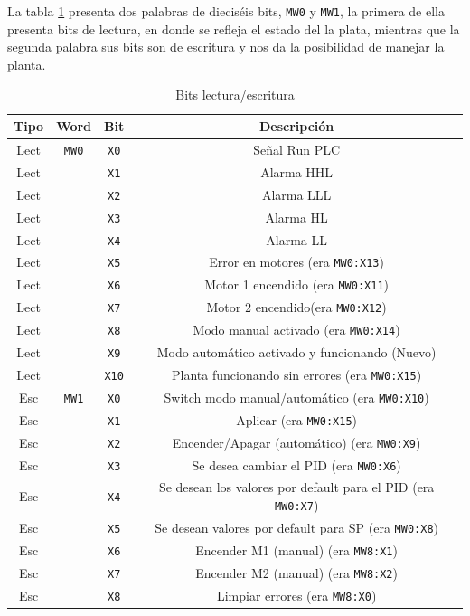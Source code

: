 La tabla \ref{table:bitlecturasescrituras} presenta dos palabras de dieciséis
bits, \verb|MW0| y \verb|MW1|, la primera de ella presenta bits de lectura, en donde se
refleja el estado del la plata, mientras que la segunda palabra sus bits son
de escritura y nos da la posibilidad de manejar la planta.
\begin{table}[!t]

\renewcommand{\arraystretch}{1.3}
\centering
\begin{tabular}{c||c||c||c}
\hline
\bfseries Tipo & \bfseries Word & \bfseries Bit & \bfseries Descripción\\
\hline \hline
Lect & \verb|MW0| & \verb|X0| & Señal Run PLC\\
Lect & & \verb|X1| & Alarma HHL\\
Lect & & \verb|X2|& Alarma LLL\\
Lect & & \verb|X3|& Alarma HL\\
Lect & & \verb|X4|& Alarma LL\\
Lect & & \verb|X5|& Error en motores (era \verb|MW0:X13|)\\
Lect & & \verb|X6|& Motor 1 encendido (era \verb|MW0:X11|)\\
Lect & & \verb|X7|& Motor 2 encendido(era \verb|MW0:X12|)\\
Lect & & \verb|X8|& Modo manual activado (era \verb|MW0:X14|)\\
Lect & & \verb|X9|& Modo automático activado y funcionando (Nuevo)\\
Lect & & \verb|X10|& Planta funcionando sin errores (era \verb|MW0:X15|)\\
\hline
Esc & \verb|MW1| & \verb|X0|& Switch modo manual/automático (era 
\verb|MW0:X10|)\\
Esc & & \verb|X1|& Aplicar (era \verb|MW0:X15|)\\
Esc & & \verb|X2|& Encender/Apagar (automático) (era \verb|MW0:X9|)\\
Esc & & \verb|X3|& Se desea cambiar el PID (era \verb|MW0:X6|)\\
Esc & & \verb|X4|& Se desean los valores por default para el PID (era 
\verb|MW0:X7|)\\
Esc & & \verb|X5|& Se desean valores por default para SP (era \verb|MW0:X8|)\\
Esc & & \verb|X6|& Encender M1 (manual) (era \verb|MW8:X1|)\\
Esc & & \verb|X7|& Encender M2 (manual) (era \verb|MW8:X2|)\\
Esc & & \verb|X8|& Limpiar errores (era \verb|MW8:X0|)\\
\hline

\hline
\end{tabular}
\caption{Bits lectura/escritura}
\label{table:bitlecturasescrituras}
\end{table}

